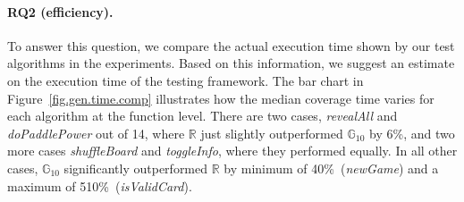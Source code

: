 \documentclass[sigconf,review]{acmart}
\newcommand{\Random}{\mathbb{R}}
\newcommand{\RGenetic}{\mathbb{G}_{10}}
\begin{document}
\paragraph{\textbf{RQ2 (efficiency).}}
 To answer this question, we compare the actual execution time shown by our test algorithms in the experiments. Based on this information, we suggest an estimate on the execution time of the testing framework. The bar chart in Figure~\ref{fig.gen.time.comp} illustrates how the median coverage time varies for each algorithm at the function level. There are two cases, \emph{revealAll} and \emph{doPaddlePower} out of 14, where $\Random$ just slightly outperformed $\RGenetic$ by 6\%, and two more cases \emph{shuffleBoard} and \emph{toggleInfo}, where they performed equally. In all other cases, $\RGenetic$ significantly outperformed $\Random$ by minimum of 40\%~(\emph{newGame}) and a maximum of 510\%~(\emph{isValidCard}). 
\end{document}
